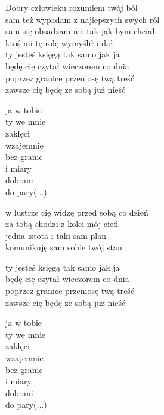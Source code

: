 \begin{text}
    Dobry człowieku rozumiem twój ból\\
    sam też wypadam z najlepszych swych ról\\
    sam się obsadzam nie tak jak bym chciał\\
    ktoś mi tę rolę wymyślił i dał\\
    ty jesteś księgą tak samo jak ja\\
    będę cię czytał wieczorem co dnia\\
    poprzez granice przeniosę twą treść\\
    zawsze cię będę ze sobą już nieść

    ja w tobie\\
    ty we mnie\\
    zaklęci\\
    wzajemnie\\
    bez granic\\
    i miary\\
    dobrani\\
    do pary(...)

    w lustrze cię widzę przed sobą co dzień\\
    za tobą chodzi z kolei mój cień\\
    jedna istota i taki sam plan\\
    komunikuję sam sobie twój stan

    ty jesteś księgą tak samo jak ja\\
    będę cię czytał wieczorem co dnia\\
    poprzez granice przeniosę twą treść\\
    zawsze cię będę ze sobą już nieść

    ja w tobie\\
    ty we mnie\\
    zaklęci\\
    wzajemnie\\
    bez granic\\
    i miary\\
    dobrani\\
    do pary(...)
\end{text}
\begin{chord}

\end{chord}